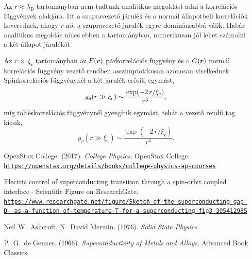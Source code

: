 \documentclass[a4paper,12pt,titlepage]{article}
\newcommand{\RR}{{\vb*{r}}}
\begin{document}
Az $r \approx \lambda_\text{D}$ tartományban nem tudtunk analitikus megoldást adni a korrelációs függvények alakjára.  Itt a szupravezető járulék és a normál állapotbeli korrelációk keverednek, ahogy $r$ nő, a szupravezető járulék egyre dominánsabbá válik.  Habár analitikus megoldás nincs ebben a tartományban, numerikusan jól lehet számolni a két állapot járulékát.

Az $r \gg \xi_\text{c}$ tartományban az $F(\RR)$ párkorrelációs függvény és a $G(\RR)$ normál korrelációs függvény vezető rendben asszimptotikusan azonosan viselkednek.  Spinkorrelációs függvénynél a két járulék erősíti egymást,
\begin{equation}
	g_{\va*{s}}(r \gg \xi_\text{c}) \sim \frac{\exp(-2 \, r / \xi_\text{c})}{r^3},
\end{equation}
míg töltéskorrelációs függvénynél gyengítik egymást, tehát a vezető rendű tag kiesik,
\begin{equation}
	g_\rho(r \gg \xi_\text{c}) \sim \frac{\exp(-2 \, r / \xi_\text{c})}{r^4}.
\end{equation}




\begin{thebibliography}{}

OpenStax College. (2017). \emph{College Physics}. OpenStax College. \\
\href{https://openstax.org/details/books/college-physics-ap-courses}{\texttt{https://openstax.org/details/books/college-physics-ap-courses}}

Electric control of superconducting transition through a spin-orbit coupled interface - Scientific Figure on ResearchGate. \newline
\href{https://www.researchgate.net/figure/Sketch-of-the-superconducting-gap-D-as-a-function-of-temperature-T-for-a-superconducting_fig3_305412985}{\texttt{https://www.researchgate.net/figure/Sketch-of-the-superconducting-gap-D- as-a-function-of-temperature-T-for-a-superconducting\_fig3\_305412985}}

Neil W.\ Ashcroft, N.\ David Mermin. (1976). \emph{Solid State Physics}.

P.\ G.\ de Gennes. (1966). \emph{Superconductivity of Metals and Alloys}. \newline Advanced Book Classics.

\end{thebibliography}
\end{document}
